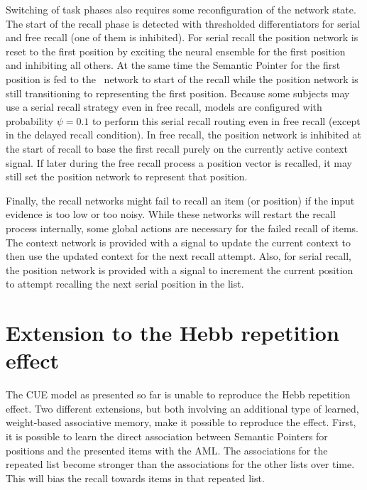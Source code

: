 Switching of task phases also requires some reconfiguration of the network state.
The start of the recall phase is detected with thresholded differentiators for serial and free recall (one of them is inhibited).
For serial recall the position network is reset to the first position by exciting the neural ensemble for the first position and inhibiting all others.
At the same time the Semantic Pointer for the first position is fed to the \mft\ network to start of the recall while the position network is still transitioning to representing the first position.
Because some subjects may use a serial recall strategy even in free recall, models are configured with probability $\psi = 0.1$ to perform this serial recall routing even in free recall (except in the delayed recall condition).
In free recall, the position network is inhibited at the start of recall to base the first recall purely on the currently active context signal.
If later during the free recall process a position vector is recalled, it may still set the position network to represent that position.

Finally, the recall networks might fail to recall an item (or position) if the input evidence is too low or too noisy.
While these networks will restart the recall process internally, some global actions are necessary for the failed recall of items.
The context network is provided with a signal to update the current context to then use the updated context for the next recall attempt.
Also, for serial recall, the position network is provided with a signal to increment the current position to attempt recalling the next serial position in the list.


\section{Extension to the Hebb repetition effect}\label{sec:hebbext}
The CUE model as presented so far is unable to reproduce the Hebb repetition effect.
Two different extensions, but both involving an additional type of learned, weight-based associative memory, make it possible to reproduce the effect.
First, it is possible to learn the direct association between Semantic Pointers for positions and the presented items with the AML\@.
The associations for the repeated list become stronger than the associations for the other lists over time.
This will bias the recall towards items in that repeated list.

